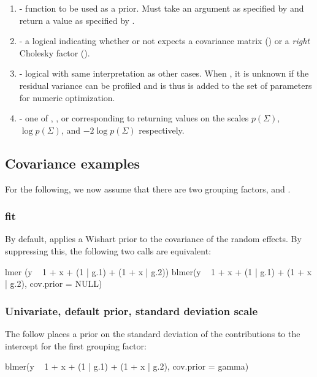 \documentclass[article,shortnames]{jss}
\begin{document}
\begin{enumerate}
\begin{enumerate}
  \item {} - function to be used as a prior. Must take an
    argument as specified by  and return a value as
    specified by .
  \item {} - a logical indicating whether or not 
    expects a covariance matrix () or a {\em right}
    Cholesky factor ().
  \item {} - logical with same interpretation as
    other cases. When , it is unknown if the residual
    variance can be profiled and is thus is added to the set of
    parameters for numeric optimization.
  \item {} - one of , , or
     corresponding to  returning values on the scales
   $p(\Sigma)$, $\log p(\Sigma)$, and $-2 \log p(\Sigma)$ respectively.
 \end{enumerate}
\end{enumerate}

\subsection{Covariance examples}

For the following, we now assume that there are two grouping factors,
 and .

\subsubsection*{ fit}

By default,  applies a Wishart prior to the covariance of
the random effects. By suppressing this, the following two calls are equivalent:

\begin{Code}
lmer (y ~ 1 + x + (1 | g.1) + (1 + x | g.2))
blmer(y ~ 1 + x + (1 | g.1) + (1 + x | g.2),
      cov.prior = NULL)
\end{Code}

\subsubsection*{Univariate, default prior, standard deviation scale}

The follow places a prior on the standard deviation of the
contributions to the intercept for the first grouping factor:

\begin{Code}
blmer(y ~ 1 + x + (1 | g.1) + (1 + x | g.2),
      cov.prior = gamma)
\end{Code}
\end{document}
